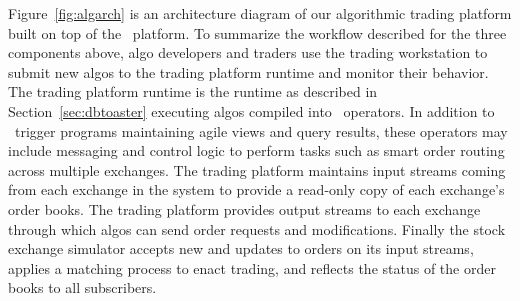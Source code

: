 Figure~\ref{fig:algarch} is an architecture diagram of our algorithmic trading
platform built on top of the \compiler\ platform. To summarize the workflow
described for the three components above, algo developers and traders use the
trading workstation to submit new algos to the trading platform runtime and
monitor their behavior. The trading platform runtime is the \compiler runtime as
described in Section~\ref{sec:dbtoaster} executing algos compiled into
\targetlang\ operators. In addition to \compiler\ trigger programs maintaining
agile views and query results, these operators may include messaging and control
logic to perform tasks such as smart order routing across multiple exchanges.
The trading platform maintains input streams coming from each exchange in the
system to provide a read-only copy of each exchange's order books. The trading
platform provides output streams to each exchange through which algos can send
order requests and modifications. Finally the stock exchange simulator accepts
new and updates to orders on its input streams, applies a matching process to
enact trading, and reflects the status of the order books to all subscribers. 

